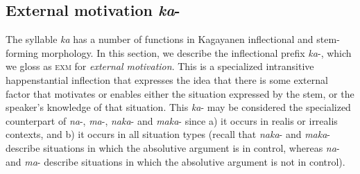 \subsection{External motivation \textit{ka}{}-}
\label{sec:externalmotivation}
\label{bkm:Ref64362346}

The syllable \textit{ka} has a number of functions in Kagayanen inflectional and stem-forming morphology. In this section, we describe the inflectional prefix \textit{ka}-, which we gloss as \textsc{exm} for \textit{external motivation}. This is a specialized intransitive happenstantial inflection that expresses the idea that there is some external factor that motivates or enables either the situation expressed by the stem, or the speaker’s knowledge of that situation. This \textit{ka}- may be considered the specialized counterpart of \textit{na}-, \textit{ma}-, \textit{naka}- and \textit{maka}- since a) it occurs in realis or irrealis contexts, and b) it occurs in all situation types (recall that \textit{naka}- and \textit{maka}- describe situations in which the absolutive argument is in control, whereas \textit{na}- and \textit{ma}- describe situations in which the absolutive argument is not in control).

